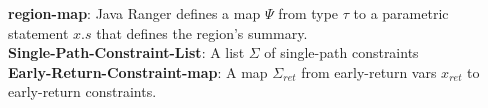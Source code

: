 \textbf{region-map}: Java Ranger defines a map $\Psi$ from type $\tau$  to a parametric statement $x.s$ that defines the region\rq s summary.\\
\textbf{Single-Path-Constraint-List}: A list $\Sigma$ of single-path constraints\\
\textbf{Early-Return-Constraint-map}: A map $\Sigma_{ret}$ from early-return vars $x_{ret}$ to early-return constraints.
%
%
